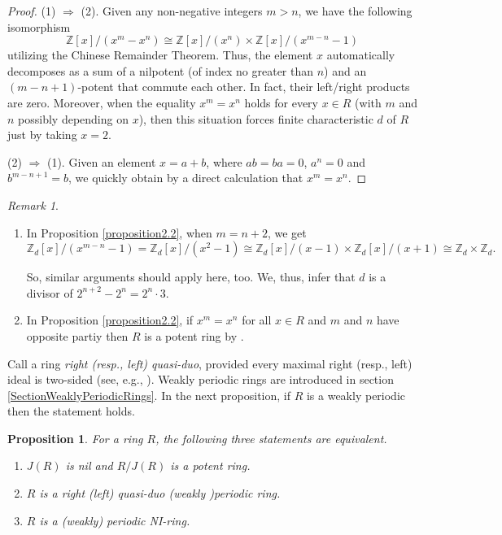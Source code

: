 \documentclass[12pt]{amsart}
\newtheorem{prop}[thm]{Proposition}
\theoremstyle{definition}
\theoremstyle{remark}
\newtheorem{rem}[thm]{Remark}
\numberwithin{equation}{section}
\begin{document}
\begin{proof}
(1) $\Rightarrow$ (2). Given any non-negative integers $m > n$, we have the following isomorphism
$$\mathbb{Z}[x]/(x^m-x^n) \cong \mathbb{Z}[x]/(x^n) \times \mathbb{Z}[x]/(x^{m-n}-1)$$
utilizing the Chinese Remainder Theorem. Thus, the element $x$ automatically decomposes as a sum of a nilpotent (of index no greater than $n$) and an $(m-n + 1)$-potent that commute each other. In fact, their left/right products are zero. Moreover, when the equality $x^m = x^n$ holds for every $x \in R$ (with $m$ and $n$ possibly depending on $x$), then this situation forces finite characteristic $d$ of $R$ just by taking $x = 2$.

(2) $\Rightarrow$ (1). Given an element $x = a+b$, where $ab = ba = 0$, $a^n=0$ and $b^{m-n+1} = b$, we quickly obtain by a direct calculation that $x^m = x^n$.
\end{proof}

\begin{rem}
\begin{enumerate}
\item[\rm{(1)}]
In Proposition \ref{proposition2.2}, when $m = n + 2$, we get
$$\mathbb{Z}_d[x]/(x^{m-n}-1) = \mathbb{Z}_d[x]/(x^2-1) \cong \mathbb{Z}_d[x]/(x-1) \times \mathbb{Z}_d[x]/(x+1) \cong \mathbb{Z}_d \times \mathbb{Z}_d.$$

\noindent So, similar arguments should apply here, too. We, thus, infer that $d$ is a divisor of $2^{n+2}-2^n = 2^n · 3$.
\item[\rm{(2)}]
In Proposition \ref{proposition2.2}, if $x^m=x^n$ for all $x \in R$ and $m$ and $n$ have opposite partiy then $R$ is a potent ring by \cite[Corollary 2.2]{Anderson}.
\end{enumerate} 
\end{rem}

Call a ring {\it right (resp., left) quasi-duo}, provided every maximal right (resp., left) ideal is two-sided (see, e.g., \cite{yu1995quasi}).
Weakly periodic rings are introduced in section \ref{SectionWeaklyPeriodicRings}. In the next proposition, if $R$ is a weakly periodic then the statement holds.

\begin{prop}\label{proposition2.1}
For a ring $R$, the following three statements are equivalent.
\begin{enumerate}
\item[\rm{(1)}]
$J(R)$ is nil and $R/J(R)$ is a potent ring.
\item[\rm{(2)}]
$R$ is a right (left) quasi-duo (weakly )periodic ring.
\item[\rm{(3)}]
$R$ is a (weakly) periodic NI-ring.
\end{enumerate}
\end{prop}
\end{document}
